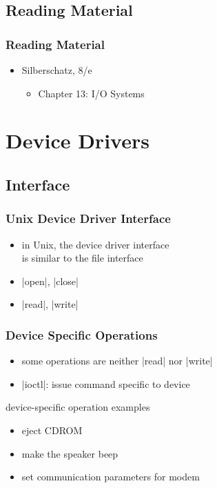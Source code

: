 \documentclass[dvipsnames]{beamer}
\begin{document}
\subsection*{Reading Material}

\begin{frame}
  \frametitle{Reading Material}

  \begin{itemize}
    \item Silberschatz, 8/e
    \begin{itemize}
      \item Chapter 13: \alert{I/O Systems}
    \end{itemize}
  \end{itemize}
\end{frame}

\section{Device Drivers}

\subsection{Interface}

\begin{frame}
  \frametitle{Unix Device Driver Interface}

  \begin{itemize}
    \item in Unix, the device driver interface\\
      is similar to the file interface

    \medskip
    \item {}|open|, |close|
    \item {}|read|, |write|
  \end{itemize}
\end{frame}

\begin{frame}
  \frametitle{Device Specific Operations}

  \begin{itemize}
    \item some operations are neither |read| nor |write|
    \item {}|ioctl|: issue command specific to device
  \end{itemize}

  \begin{exampleblock}{device-specific operation examples}
    \begin{itemize}
      \item eject CDROM
      \item make the speaker beep
      \item set communication parameters for modem
    \end{itemize}
  \end{exampleblock}
\end{frame}
\end{document}
